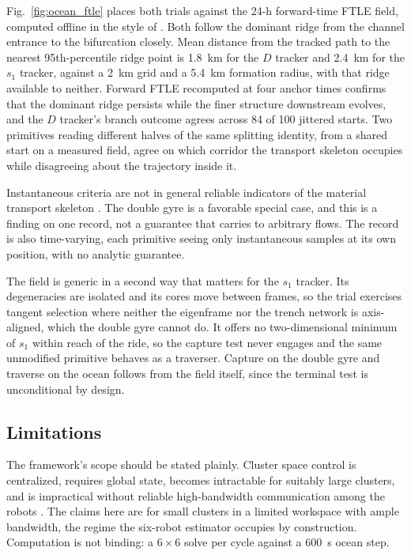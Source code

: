 \documentclass[lettersize,journal]{IEEEtran}
\begin{document}
Fig.~\ref{fig:ocean_ftle} places both trials against the 24-h forward-time
FTLE field, computed offline in the style of
\cite{11}. Both follow the dominant ridge from the channel entrance to the
bifurcation closely. Mean distance from the tracked path to the nearest
95th-percentile ridge point is 1.8~km for the $D$ tracker and 2.4~km
for the $s_1$ tracker, against a 2~km grid and a 5.4~km formation
radius, with that ridge available to neither. Forward
FTLE recomputed at four anchor times confirms that the dominant ridge
persists while the finer structure downstream evolves, and the $D$
tracker's branch outcome agrees across 84 of 100 jittered starts.
Two primitives reading different halves of the
same splitting identity, from a shared start on a measured field, agree
on which corridor the transport skeleton occupies while disagreeing
about the trajectory inside it.

Instantaneous criteria are not in general reliable indicators
of the material transport skeleton \cite{16}. The double gyre is a
favorable special case, and this is a finding on one record, not a
guarantee that carries to arbitrary flows. The record is also time-varying,
each primitive seeing only instantaneous samples at its own position,
with no analytic guarantee.

The field is generic in a second way that matters for the $s_1$ tracker.
Its degeneracies are isolated and its cores move between frames, so the
trial exercises tangent selection where neither the eigenframe nor the
trench network is axis-aligned, which the double gyre cannot do. It offers no
two-dimensional minimum of $s_1$ within reach of the ride, so the
capture test never engages and the same unmodified primitive behaves
as a traverser. Capture on the double gyre and
traverse on the ocean follows from the field itself, since the terminal
test is unconditional by design.

\subsection{Limitations}
\label{sec:disc_limits}

The framework's scope should be stated plainly. Cluster
space control is centralized, requires global state, becomes intractable
for suitably large clusters, and is impractical without reliable
high-bandwidth communication among the robots \cite{31}. The claims here
are for small clusters in a limited workspace with ample bandwidth, the
regime the six-robot estimator occupies by construction. Computation is
not binding: a $6 \times 6$ solve per cycle against a $600$~s ocean step.
\end{document}
